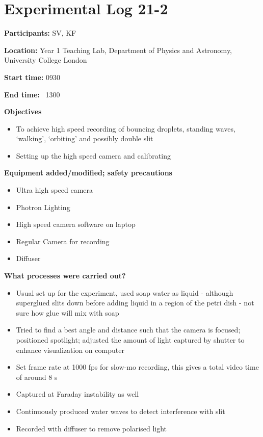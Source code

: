 
\section{Experimental Log 21-2}

\textbf{Participants:} SV, KF

\textbf{Location:} Year 1 Teaching Lab, Department of Physics and Astronomy, University College London

\textbf{Start time:} 0930

\textbf{End time:} \ 1300


\bigskip

\textbf{Objectives}

\begin{itemize}
\item To achieve high speed recording of bouncing droplets, standing waves, `walking', `orbiting' and possibly double slit
\item Setting up the high speed camera and calibrating
\end{itemize}
\bigskip

\textbf{Equipment added/modified; safety precautions}

\begin{itemize}
\item Ultra high speed camera
\item Photron Lighting
\item High speed camera software on laptop
\item Regular Camera for recording
\item Diffuser
\end{itemize}
\bigskip

\textbf{What processes were carried out?}

\begin{itemize}
\item Usual set up for the experiment, used soap water as liquid - although superglued slits down before adding liquid in a region of the petri dish - not sure how glue will mix with soap
\item Tried to find a best angle and distance such that the camera is focused; positioned spotlight; adjusted the amount of light captured by shutter to enhance visualization on computer
\item Set frame rate at 1000 fps for slow-mo recording, this gives a total video time of around 8 s
\item Captured at Faraday instability as well
\item Continuously produced water waves to detect interference with slit
\item Recorded with diffuser to remove polarised light
\end{itemize}
\bigskip

